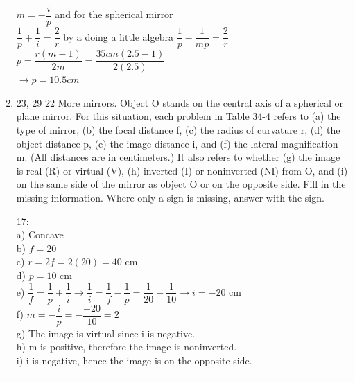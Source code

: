 \documentclass[fleqn]{article}
\begin{document}
\begin{enumerate}
      \textcolor{hwColor}{
        $
          m=-\dfrac{i}{p}
        $ 
        and for the spherical mirror
        \\
        $
          \dfrac{1}{p}+\dfrac{1}{i}=\dfrac{2}{r}
        $ 
        by a doing a little algebra
        $
          \dfrac{1}{p}-\dfrac{1}{mp}=\dfrac{2}{r}
        $
        \\
        $
          p=\dfrac{r(m-1)}{2m}=\dfrac{35 cm(2.5-1)}{2(2.5)}
        $
        \\
        $
          \rightarrow p=10.5 cm
        $
      }

    \item 23, 29 22 More mirrors. Object O stands on the central axis of a spherical or plane mirror. For this situation, each problem in Table 34-4 refers to (a) the type of mirror, (b) the focal distance f, (c) the radius of curvature r, (d) the object distance p, (e) the image distance i, and (f) the lateral magnification m. (All distances are in centimeters.) It also refers to whether (g) the image is real (R) or virtual (V), (h) inverted (I) or noninverted (NI) from O, and (i) on the same side of the mirror as object O or on the opposite side. Fill in the missing information. Where only a sign is missing, answer with the sign.
    
    \textcolor{hwColor}{
      17:  \\
      a) Concave \\
      b) $f=20$ \\
      c) $r=2f=2(20)=40$ cm \\
      d) $p=10$ cm \\
      e) $\dfrac{1}{f}=\dfrac{1}{p}+\dfrac{1}{i} \rightarrow \dfrac{1}{i}=\dfrac{1}{f}-\dfrac{1}{p}=\dfrac{1}{20}-\dfrac{1}{10} \rightarrow i=-20$ cm \\
      f) $m=-\dfrac{i}{p}=-\dfrac{-20}{10}=2$ \\
      g) The image is virtual since i is negative. \\
      h) m is positive, therefore the image is noninverted. \\
      i) i is negative, hence the image is on the opposite side. \\
    }

    \textcolor{hwColor}{
      \rule{15cm}{0.4pt}
    }


\end{enumerate}
\end{document}

